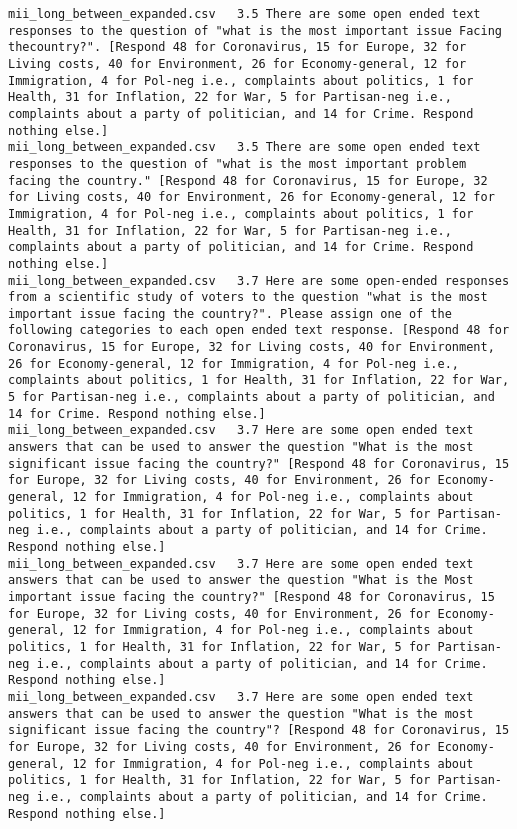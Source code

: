 \begin{lstlisting}[label=lst:promptvariants]
mii_long_between_expanded.csv	3.5	There are some open ended text responses to the question of "what is the most important issue Facing thecountry?". [Respond 48 for Coronavirus, 15 for Europe, 32 for Living costs, 40 for Environment, 26 for Economy-general, 12 for Immigration, 4 for Pol-neg i.e., complaints about politics, 1 for Health, 31 for Inflation, 22 for War, 5 for Partisan-neg i.e., complaints about a party of politician, and 14 for Crime. Respond nothing else.]
mii_long_between_expanded.csv	3.5	There are some open ended text responses to the question of "what is the most important problem facing the country." [Respond 48 for Coronavirus, 15 for Europe, 32 for Living costs, 40 for Environment, 26 for Economy-general, 12 for Immigration, 4 for Pol-neg i.e., complaints about politics, 1 for Health, 31 for Inflation, 22 for War, 5 for Partisan-neg i.e., complaints about a party of politician, and 14 for Crime. Respond nothing else.]
mii_long_between_expanded.csv	3.7	Here are some open-ended responses from a scientific study of voters to the question "what is the most important issue facing the country?". Please assign one of the following categories to each open ended text response. [Respond 48 for Coronavirus, 15 for Europe, 32 for Living costs, 40 for Environment, 26 for Economy-general, 12 for Immigration, 4 for Pol-neg i.e., complaints about politics, 1 for Health, 31 for Inflation, 22 for War, 5 for Partisan-neg i.e., complaints about a party of politician, and 14 for Crime. Respond nothing else.]
mii_long_between_expanded.csv	3.7	Here are some open ended text answers that can be used to answer the question "What is the most significant issue facing the country?" [Respond 48 for Coronavirus, 15 for Europe, 32 for Living costs, 40 for Environment, 26 for Economy-general, 12 for Immigration, 4 for Pol-neg i.e., complaints about politics, 1 for Health, 31 for Inflation, 22 for War, 5 for Partisan-neg i.e., complaints about a party of politician, and 14 for Crime. Respond nothing else.]
mii_long_between_expanded.csv	3.7	Here are some open ended text answers that can be used to answer the question "What is the Most important issue facing the country?" [Respond 48 for Coronavirus, 15 for Europe, 32 for Living costs, 40 for Environment, 26 for Economy-general, 12 for Immigration, 4 for Pol-neg i.e., complaints about politics, 1 for Health, 31 for Inflation, 22 for War, 5 for Partisan-neg i.e., complaints about a party of politician, and 14 for Crime. Respond nothing else.]
mii_long_between_expanded.csv	3.7	Here are some open ended text answers that can be used to answer the question "What is the most significant issue facing the country"? [Respond 48 for Coronavirus, 15 for Europe, 32 for Living costs, 40 for Environment, 26 for Economy-general, 12 for Immigration, 4 for Pol-neg i.e., complaints about politics, 1 for Health, 31 for Inflation, 22 for War, 5 for Partisan-neg i.e., complaints about a party of politician, and 14 for Crime. Respond nothing else.]

\end{lstlisting}
